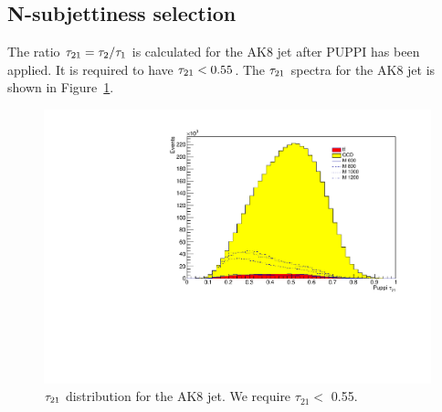 \subsection{N-subjettiness selection\label{sec:EvtSelNsubjettiness}}

The ratio $\tau_{21} = \tau_2/\tau_1$  is calculated for the AK8 jet after PUPPI has been applied. It is required to have $\tau_{21} < 0.55$. 
The $\tau_{21}$ spectra for the AK8 jet is shown in Figure~\ref{fig:tau21}.

\begin{figure}[th!b]
\begin{center}
\includegraphics[scale=0.5]{F5/shapeptau21.pdf}
\end{center}
\caption{$\tau_{21}$ distribution for the AK8 jet. We require $\tau_{21} <$ 0.55.\label{fig:tau21}}
\end{figure}


